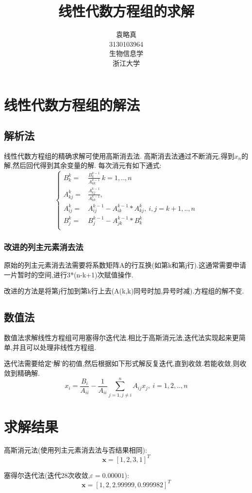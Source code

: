 \documentclass[10pt,a4paper]{article}
\title{线性代数方程组的求解}
\author{袁略真\\3130103964\\生物信息学\\浙江大学}
\begin{document}
\maketitle

\section{线性代数方程组的解法}
\subsection{解析法}
线性代数方程组的精确求解可使用高斯消去法. 高斯消去法通过不断消元,得到$x_n$的解,然后回代得到其余变量的解. 每次消元有如下通式:
\begin{equation}
\left\lbrace
\begin{aligned}
B_k^k =& \frac{B_k^{k-1}}{A_{kk}^{k-1}}\ k=1,..,n\\
A_{kj}^k =& \frac{A_{kj}^{k-1}}{A_{kk}^{k-1}},\\
A_{ij}^k =& A_{ij}^{k-1} - A_{ik}^{k-1}*A_{kj}^k,\ i,j=k+1,..,n\\
B_j^k =& B_j^{k-1} - A_{jk}^{k-1}*B_k^k\\
\end{aligned}
\right.
\end{equation}
\subsubsection{改进的列主元素消去法}
原始的列主元素消去法需要将系数矩阵A的行互换(如第k和第j行).这通常需要申请一片暂时的空间,进行3*(n-k+1)次赋值操作.

改进的方法是将第j行加到第k行上去(A(k,k)同号时加,异号时减).方程组的解不变.
\subsection{数值法}
数值法求解线性方程组可用塞得尔迭代法.相比于高斯消元法,迭代法实现起来更简单,并且可以处理非线性方程组.

迭代法需要给定`解'的初值,然后根据如下形式解反复迭代,直到收敛.若能收敛,则收敛到精确解.
$$x_i = \frac{B_{i}}{A_{ii}} - \frac{1}{A_{ii}} \sum\limits_{j=1,j\neq i}^n A_{ij}x_j,\ i=1,2,..,n$$

\section{求解结果}
高斯消元法(使用列主元素消去法与否结果相同):
$$\textbf{x} = [1,2,3,1]^T$$

塞得尔迭代法(迭代28次收敛,$\varepsilon = 0.00001$):
$$\textbf{x} = [1,2,2.99999,0.999982]^T$$
\end{document}
